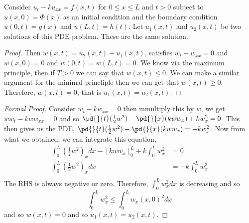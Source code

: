 \begin{nthm}[Uniqueness]
  Consider $u_t - ku_{xx} = f(x, t)$ for $0 \le x \le L$ and $t > 0$ subject to $u(x, 0) = \Phi(x)$ as an initial condition and the boundary condition $u(0, t) = g(x)$ and $u(L, t) = h(t)$. Let $u_1(x, t)$ and $u_2(x, t)$ be two solutions of this PDE problem. These are the same solution.
\end{nthm}
\begin{proof}
  Then $w(x, t) = u_2(x, t) - u_1(x, t)$, satisfies $w_{t} - w_{xx} = 0$ and $w(x, 0) = 0$ and $w(0, t)= w(L, t) = 0$. We know via the maximum principle, then if $T > 0$ we can say that $w(x, t) \le 0$.
  We can make a similar argument for the minimal princliple then we can get that $w(x, t) \ge 0$. Therefore, $w(x, t) = 0$, that is $u_1(x, t) = u_2(x, t)$.
\end{proof}
\begin{proof}[Formal Proof]
  Consider $w_t - kw_{xx} = 0$ then mmultiply this by $w$, we get $ww_t - kww_{xx} = 0$ and so $\pd{}{t}(\frac{1}{2}w^2) - \pd{}{x}(kww_x) + kw_x^2 = 0$. This then gives us the PDE, $\pd{}{t}(\frac{1}{2}w^2) - \pd{}{x}(kww_x) = -kw_x^2$. Now from what we obtained, we can integrate this equation,
  \begin{align*}
    \int_0^L \left(\frac{1}{2}w^2\right)_xdx - [kww_x]_0^L + k\int_0^L w_x^2 &= 0 \\
    \int_0^L \left(\frac{1}{2}w^2\right)_xdx &=- k\int_0^L w_x^2 \\
  \end{align*}
  The RHS is always negative or zero. Therefore, $\int_0^L w_x^2dx$ is decreasing and so
  $$ \int_0^L w_x^2 \le \int_0^L w_x(x, 0)^2 dx  $$
  and so $w(x, t) = 0$ and so $u_1(x, t) = u_2(x, t)$.
\end{proof}
